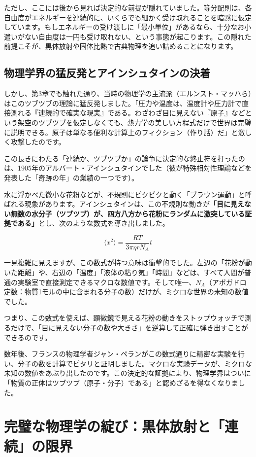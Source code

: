 ただし、ここには後から見れば決定的な前提が隠れていました。等分配則は、各自由度がエネルギーを連続的に、いくらでも細かく受け取れることを暗黙に仮定しています。もしエネルギーの受け渡しに「最小単位」があるなら、十分なお小遣いがない自由度は一円も受け取れない、という事態が起こります。この隠れた前提こそが、黒体放射や固体比熱で古典物理を追い詰めることになります。

\subsection{物理学界の猛反発とアインシュタインの決着}

しかし、第3章でも触れた通り、当時の物理学の主流派（エルンスト・マッハら）はこのツブツブの理論に猛反発しました。「圧力や温度は、温度計や圧力計で直接測れる『連続的で確実な現実』である。わざわざ目に見えない『原子』などという架空のツブツブを仮定しなくても、熱力学の美しい方程式だけで世界は完璧に説明できる。原子は単なる便利な計算上のフィクション（作り話）だ」と激しく攻撃したのです。

この長きにわたる「連続か、ツブツブか」の論争に決定的な終止符を打ったのは、1905年のアルバート・アインシュタインでした（彼が特殊相対性理論などを発表した「奇跡の年」の業績の一つです）。

水に浮かべた微小な花粉などが、不規則にピクピクと動く「ブラウン運動」と呼ばれる現象があります。アインシュタインは、この不規則な動きが\textbf{「目に見えない無数の水分子（ツブツブ）が、四方八方から花粉にランダムに激突している証拠である」}とし、次のような数式を導き出しました。

\[\langle x^2 \rangle = \frac{RT}{3\pi \eta r N_A} t\]

一見複雑に見えますが、この数式が持つ意味は衝撃的でした。左辺の「花粉が動いた距離」や、右辺の「温度」「液体の粘り気」「時間」などは、すべて人間が普通の実験室で直接測定できるマクロな数値です。そして唯一、\(N_A\)（アボガドロ定数：物質1モルの中に含まれる分子の数）だけが、ミクロな世界の未知の数値でした。

つまり、この数式を使えば、顕微鏡で見える花粉の動きをストップウォッチで測るだけで、「目に見えない分子の数や大きさ」を逆算して正確に弾き出すことができるのです。

数年後、フランスの物理学者ジャン・ペランがこの数式通りに精密な実験を行い、分子の数を計算でピタリと証明しました。マクロな実験データが、ミクロな未知の数値をあぶり出したのです。この決定的な証拠により、物理学界はついに「物質の正体はツブツブ（原子・分子）である」と認めざるを得なくなりました。

\section{完璧な物理学の綻び：黒体放射と「連続」の限界}

